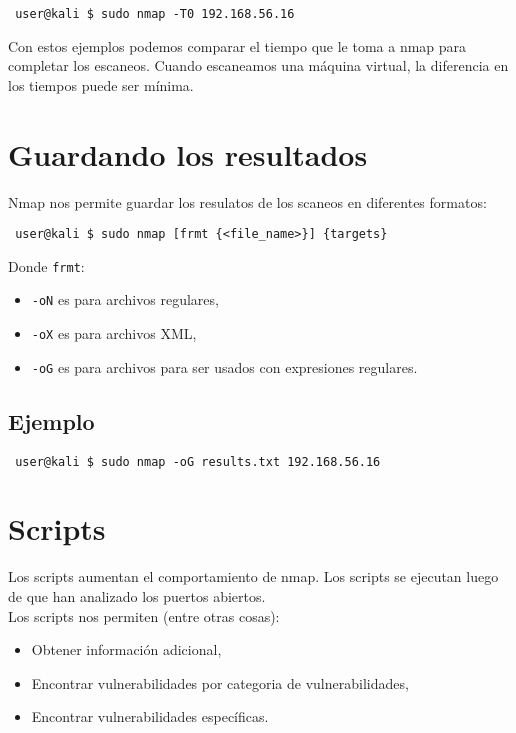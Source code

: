 \documentclass{article}
\begin{document}
\begin{lstlisting}
 user@kali $ sudo nmap -T0 192.168.56.16
\end{lstlisting}

Con estos ejemplos podemos comparar el tiempo que le toma a nmap para completar los escaneos. Cuando escaneamos una m\'aquina virtual, la diferencia en los tiempos puede ser m\'inima.\\

\section{Guardando los resultados}

Nmap nos permite guardar los resulatos de los scaneos en diferentes formatos:

\begin{lstlisting}
 user@kali $ sudo nmap [frmt {<file_name>}] {targets}
\end{lstlisting}

Donde \texttt{frmt}:

\begin{itemize}
    \item \texttt{-oN} es para archivos regulares,
    \item \texttt{-oX} es para archivos XML,
    \item \texttt{-oG} es para archivos para ser usados con expresiones regulares.
\end{itemize}

\subsection{Ejemplo}

\begin{lstlisting}
 user@kali $ sudo nmap -oG results.txt 192.168.56.16
\end{lstlisting}

\section{Scripts}

Los scripts aumentan el comportamiento de nmap. Los scripts se ejecutan luego de que han analizado los puertos abiertos.\\

Los scripts nos permiten (entre otras cosas):

\begin{itemize}
    \item Obtener informaci\'on adicional,
    \item Encontrar vulnerabilidades por categoria de vulnerabilidades,
    \item Encontrar vulnerabilidades espec\'ificas.
\end{itemize}
\end{document}
